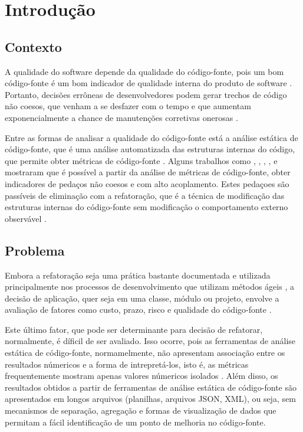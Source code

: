 \chapter{Introdução}


\section {Contexto}
A qualidade do software depende da qualidade do código-fonte, pois um bom código-fonte é um bom indicador de qualidade interna do produto de software \cite{beck2003test} \cite{ISO25023}. Portanto, decisões errôneas de desenvolvedores podem gerar trechos de código não coesos, que venham a se desfazer com o tempo e que aumentam exponencialmente a chance de manutenções corretivas onerosas \cite{beck2007implementation} \cite{beck1999}.


Entre as formas de analisar a qualidade do código-fonte está a análise estática de código-fonte, que é uma análise automatizada das estruturas internas do código, que permite obter métricas de código-fonte \cite{Emanuelsson2008} \cite{Wichmann95}  \cite{Nielson:1999} \cite{Sommerville10}. Alguns trabalhos como , , , ,  e  mostraram que é possível a partir da análise de métricas de código-fonte, obter indicadores de pedaços não coesos e com alto acoplamento. Estes pedaçoes são passíveis de eliminação com a refatoração, que é a técnica de modificação das estruturas internas do código-fonte sem modificação o comportamento externo observável \cite{fowler1999refactoring}.


\section{Problema}


Embora a refatoração seja uma prática bastante documentada e utilizada principalmente nos processos de desenvolvimento que utilizam métodos ágeis \cite{beck1999}, a decisão de aplicação, quer seja em uma classe, módulo ou projeto, envolve a avaliação de fatores como custo, prazo, risco e qualidade do código-fonte \cite{yamashita2013assessing}.  

Este último fator, que pode ser determinante para decisão de refatorar, normalmente, é díficil de ser avaliado. Isso ocorre, pois as ferramentas de análise estática de código-fonte, normamelmente, não apresentam associação entre os resultados númericos e a forma de intrepretá-los, isto é, as métricas frequentemente mostram apenas valores númericos isolados \cite{Meirelles2013}. Além disso, os resultados obtidos a partir de ferramentas de análise estática de código-fonte são apresentados em longos arquivos (planilhas, arquivos JSON, XML), ou seja, sem mecanismos de separação, agregação e formas de visualização de dados que permitam a fácil identificação de um ponto de melhoria no código-fonte.


